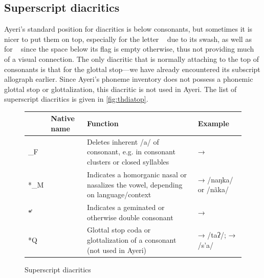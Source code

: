 \subsection{Superscript diacritics}

Ayeri's standard position for diacritics is below consonants, but sometimes it 
is nicer to put them on top, especially for the letter ~ due to 
its swash, as well as for ~ since the space below its flag is 
empty otherwise, thus not providing much of a visual connection. The only 
diacritic that is normally attaching to the top of consonants is that for the 
glottal stop---we have already encountered its subscript allograph earlier. 
Since Ayeri's phoneme inventory does not possess a phonemic glottal stop or 
glottalization, this diacritic is not used in Ayeri. The list of superscript 
diacritics is given in \autoref{fig:thdiatop}.

\begin{figure}[htp]
\caption{Superscript diacritics}
\begin{tabu} to 
\toprule
\tableheaderfont

	& Native name
	& Function
	& Example
	\\
	
\toprule

*\_F
	& 
	& Deletes inherent /a/ of consonant, e.g. in consonant clusters or 
		closed syllables
	&  → 
	\\
	
\midrule

*\_M
	& 
	& Indicates a homorganic nasal or nasalizes the vowel, depending on 
		language/context
	&  →  /naŋka/ or /nãka/
	\\
	
\midrule

*̔
	& 
	& Indicates a geminated or otherwise double consonant
	&  → 
	\\
	
\midrule

*Q
	& 
	& Glottal stop coda or glottalization of a consonant (not used in Ayeri)
	&  →  /taʔ/;\newline
		 →  /s’a/
	\\

\bottomrule
\end{tabu}
\label{fig:thdiatop}
\end{figure}

